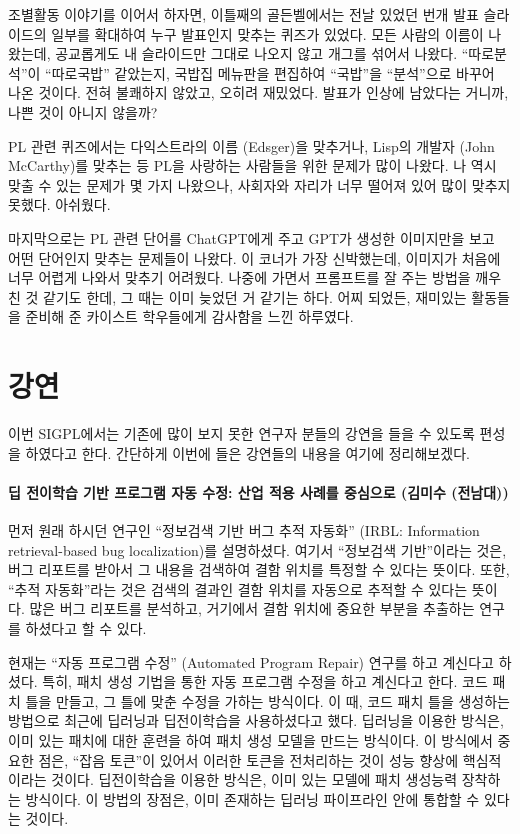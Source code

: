\documentclass{article}
\begin{document}
조별활동 이야기를 이어서 하자면, 이틀째의 골든벨에서는 전날 있었던 번개 발표 슬라이드의 일부를 확대하여 누구 발표인지 맞추는 퀴즈가 있었다.
모든 사람의 이름이 나왔는데, 공교롭게도 내 슬라이드만 그대로 나오지 않고 개그를 섞어서 나왔다.
``따로분석''이 ``따로국밥'' 같았는지, 국밥집 메뉴판을 편집하여 ``국밥''을 ``분석''으로 바꾸어 나온 것이다.
전혀 불쾌하지 않았고, 오히려 재밌었다.
발표가 인상에 남았다는 거니까, 나쁜 것이 아니지 않을까?

PL 관련 퀴즈에서는 다익스트라의 이름 (Edsger)을 맞추거나, Lisp의 개발자 (John McCarthy)를 맞추는 등 PL을 사랑하는 사람들을 위한 문제가 많이 나왔다.
나 역시 맞출 수 있는 문제가 몇 가지 나왔으나, 사회자와 자리가 너무 떨어져 있어 많이 맞추지 못했다. 아쉬웠다.

마지막으로는 PL 관련 단어를 ChatGPT에게 주고 GPT가 생성한 이미지만을 보고 어떤 단어인지 맞추는 문제들이 나왔다.
이 코너가 가장 신박했는데, 이미지가 처음에 너무 어렵게 나와서 맞추기 어려웠다.
나중에 가면서 프롬프트를 잘 주는 방법을 깨우친 것 같기도 한데, 그 때는 이미 늦었던 거 같기는 하다.
어찌 되었든, 재미있는 활동들을 준비해 준 카이스트 학우들에게 감사함을 느낀 하루였다.
\section{강연}
이번 SIGPL에서는 기존에 많이 보지 못한 연구자 분들의 강연을 들을 수 있도록 편성을 하였다고 한다.
간단하게 이번에 들은 강연들의 내용을 여기에 정리해보겠다.

\paragraph{딥 전이학습 기반 프로그램 자동 수정: 산업 적용 사례를 중심으로 (김미수 (전남대))}
먼저 원래 하시던 연구인 ``정보검색 기반 버그 추적 자동화'' (IRBL: Information retrieval-based bug localization)를 설명하셨다.
여기서 ``정보검색 기반''이라는 것은, 버그 리포트를 받아서 그 내용을 검색하여 결함 위치를 특정할 수 있다는 뜻이다.
또한, ``추적 자동화''라는 것은 검색의 결과인 결함 위치를 자동으로 추적할 수 있다는 뜻이다.
많은 버그 리포트를 분석하고, 거기에서 결함 위치에 중요한 부분을 추출하는 연구를 하셨다고 할 수 있다.

현재는 ``자동 프로그램 수정'' (Automated Program Repair) 연구를 하고 계신다고 하셨다.
특히, 패치 생성 기법을 통한 자동 프로그램 수정을 하고 계신다고 한다.
코드 패치 틀을 만들고, 그 틀에 맞춘 수정을 가하는 방식이다.
이 때, 코드 패치 틀을 생성하는 방법으로 최근에 딥러닝과 딥전이학습을 사용하셨다고 했다.
딥러닝을 이용한 방식은, 이미 있는 패치에 대한 훈련을 하여 패치 생성 모델을 만드는 방식이다.
이 방식에서 중요한 점은, ``잡음 토큰''이 있어서 이러한 토큰을 전처리하는 것이 성능 향상에 핵심적이라는 것이다.
딥전이학습을 이용한 방식은, 이미 있는 모델에 패치 생성능력 장착하는 방식이다.
이 방법의 장점은, 이미 존재하는 딥러닝 파이프라인 안에 통합할 수 있다는 것이다.
\end{document}
